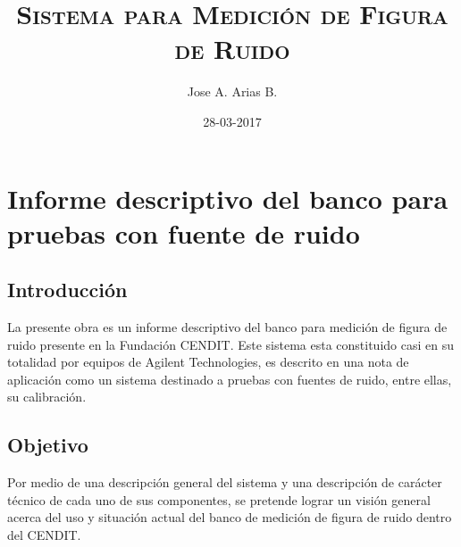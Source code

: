 \documentclass{article}
\begin{document}
	\title{\textsc{Sistema para Medición de Figura de Ruido}} 
	\author{Jose A. Arias B.}
	\date{28-03-2017}
	\maketitle
	\clearpage
	
	
	\tableofcontents
	
	\clearpage
	
	\section{Informe descriptivo del banco para pruebas con fuente de ruido}
	\subsection{Introducción}
	La presente obra es un informe descriptivo del banco para medición de figura de ruido presente en la Fundación CENDIT.
	Este sistema esta constituido casi en su totalidad por equipos de Agilent Technologies, es descrito en una nota de	aplicación como un sistema destinado a pruebas con fuentes de ruido, entre ellas, su calibración.
	
	\subsection{Objetivo}
	Por medio de una descripción general del sistema y una descripción de carácter técnico de cada uno de sus componentes, se pretende lograr un visión general acerca del uso y situación actual del banco de medición de figura de ruido dentro del CENDIT.
	
\end{document}
